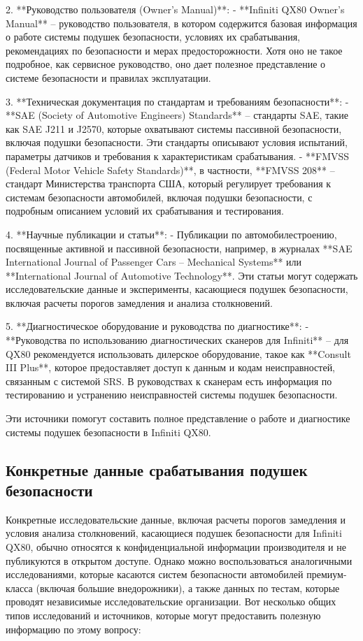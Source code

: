 2. **Руководство пользователя (Owner's Manual)**:
- **Infiniti QX80 Owner’s Manual** – руководство пользователя, в котором содержится базовая информация о работе системы подушек безопасности, условиях их срабатывания, рекомендациях по безопасности и мерах предосторожности. Хотя оно не такое подробное, как сервисное руководство, оно дает полезное представление о системе безопасности и правилах эксплуатации.

3. **Техническая документация по стандартам и требованиям безопасности**:
- **SAE (Society of Automotive Engineers) Standards** – стандарты SAE, такие как SAE J211 и J2570, которые охватывают системы пассивной безопасности, включая подушки безопасности. Эти стандарты описывают условия испытаний, параметры датчиков и требования к характеристикам срабатывания.
- **FMVSS (Federal Motor Vehicle Safety Standards)**, в частности, **FMVSS 208** – стандарт Министерства транспорта США, который регулирует требования к системам безопасности автомобилей, включая подушки безопасности, с подробным описанием условий их срабатывания и тестирования.

4. **Научные публикации и статьи**:
- Публикации по автомобилестроению, посвященные активной и пассивной безопасности, например, в журналах **SAE International Journal of Passenger Cars – Mechanical Systems** или **International Journal of Automotive Technology**. Эти статьи могут содержать исследовательские данные и эксперименты, касающиеся подушек безопасности, включая расчеты порогов замедления и анализа столкновений.

5. **Диагностическое оборудование и руководства по диагностике**:
- **Руководства по использованию диагностических сканеров для Infiniti** – для QX80 рекомендуется использовать дилерское оборудование, такое как **Consult III Plus**, которое предоставляет доступ к данным и кодам неисправностей, связанным с системой SRS. В руководствах к сканерам есть информация по тестированию и устранению неисправностей системы подушек безопасности.

Эти источники помогут составить полное представление о работе и диагностике системы подушек безопасности в Infiniti QX80.


\subsection{Конкретные данные срабатывания подушек безопасности}

Конкретные исследовательские данные, включая расчеты порогов замедления и условия анализа столкновений, касающиеся подушек безопасности для Infiniti QX80, обычно относятся к конфиденциальной информации производителя и не публикуются в открытом доступе. Однако можно воспользоваться аналогичными исследованиями, которые касаются систем безопасности автомобилей премиум-класса (включая большие внедорожники), а также данных по тестам, которые проводят независимые исследовательские организации. Вот несколько общих типов исследований и источников, которые могут предоставить полезную информацию по этому вопросу:

